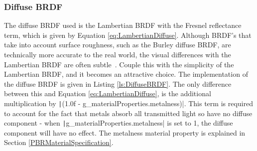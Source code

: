 

\subsubsection{Diffuse BRDF}

The diffuse BRDF used is the Lambertian BRDF with the Fresnel reflectance term, which is given by Equation \ref{eq:LambertianDiffuse}. Although BRDF's that take into account surface roughness, such as the Burley diffuse BRDF, are technically more accurate to the real world, the visual differences with the Lambertian BRDF are often subtle~\cite{RealShadingInUnreal}. Couple this with the simplicity of the Lambertian BRDF, and it becomes an attractive choice. The implementation of the diffuse BRDF is given in Listing \ref{ls:DiffuseBRDF}. The only difference between this and Equation \ref{eq:LambertianDiffuse}, is the additional multiplication by \texttt|(1.0f - g_materialProperties.metalness)|. This term is required to account for the fact that metals absorb all transmitted light so have no diffuse component - when \texttt|g_materialProperties.metalness| is set to 1, the diffuse component will have no effect. The metalness material property is explained in Section \ref{PBRMaterialSpecification}.

